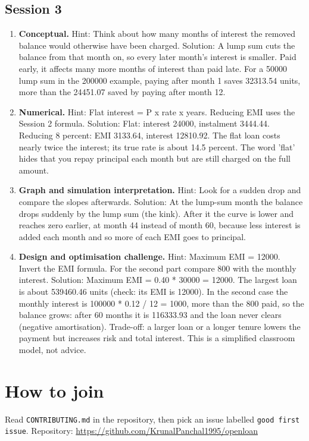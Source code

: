 \documentclass[11pt,a4paper]{article}
\begin{document}
\subsection*{Session 3}
\begin{enumerate}[nosep]
\item \textbf{Conceptual.} Hint: Think about how many months of interest the removed balance would otherwise have been charged. Solution: A lump sum cuts the balance from that month on, so every later month's interest is smaller. Paid early, it affects many more months of interest than paid late. For a 50000 lump sum in the 200000 example, paying after month 1 saves 32313.54 units, more than the 24451.07 saved by paying after month 12.
\item \textbf{Numerical.} Hint: Flat interest = P x rate x years. Reducing EMI uses the Session 2 formula. Solution: Flat: interest 24000, instalment 3444.44. Reducing 8 percent: EMI 3133.64, interest 12810.92. The flat loan costs nearly twice the interest; its true rate is about 14.5 percent. The word 'flat' hides that you repay principal each month but are still charged on the full amount.
\item \textbf{Graph and simulation interpretation.} Hint: Look for a sudden drop and compare the slopes afterwards. Solution: At the lump-sum month the balance drops suddenly by the lump sum (the kink). After it the curve is lower and reaches zero earlier, at month 44 instead of month 60, because less interest is added each month and so more of each EMI goes to principal.
\item \textbf{Design and optimisation challenge.} Hint: Maximum EMI = 12000. Invert the EMI formula. For the second part compare 800 with the monthly interest. Solution: Maximum EMI = 0.40 * 30000 = 12000. The largest loan is about 539460.46 units (check: its EMI is 12000). In the second case the monthly interest is 100000 * 0.12 / 12 = 1000, more than the 800 paid, so the balance grows: after 60 months it is 116333.93 and the loan never clears (negative amortisation). Trade-off: a larger loan or a longer tenure lowers the payment but increases risk and total interest. This is a simplified classroom model, not advice.
\end{enumerate}

\section{How to join}
Read \texttt{CONTRIBUTING.md} in the repository, then pick an issue labelled \texttt{good first issue}. Repository: \url{https://github.com/KrunalPanchal1995/openloan}
\end{document}
